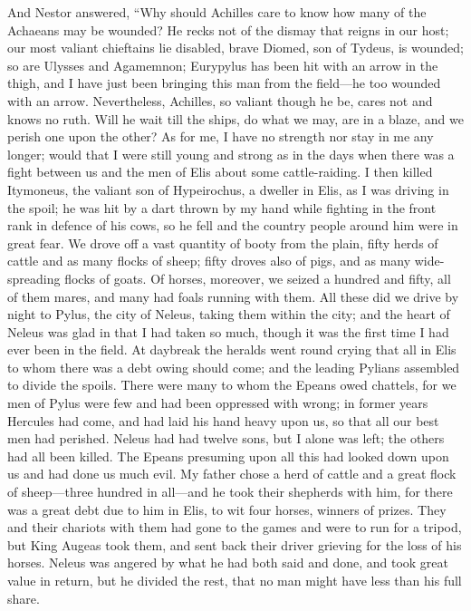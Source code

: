 And Nestor answered, “Why should Achilles care to know how many of the
Achaeans may be wounded? He recks not of the dismay that reigns in our
host; our most valiant chieftains lie disabled, brave Diomed, son of
Tydeus, is wounded; so are Ulysses and Agamemnon; Eurypylus has been hit
with an arrow in the thigh, and I have just been bringing this man from
the field—he too wounded with an arrow. Nevertheless, Achilles, so
valiant though he be, cares not and knows no ruth. Will he wait till the
ships, do what we may, are in a blaze, and we perish one upon the other?
As for me, I have no strength nor stay in me any longer; would that I were
still young and strong as in the days when there was a fight between us
and the men of Elis about some cattle-raiding. I then killed Itymoneus,
the valiant son of Hypeirochus, a dweller in Elis, as I was driving in the
spoil; he was hit by a dart thrown by my hand while fighting in the front
rank in defence of his cows, so he fell and the country people around him
were in great fear. We drove off a vast quantity of booty from the plain,
fifty herds of cattle and as many flocks of sheep; fifty droves also of
pigs, and as many wide-spreading flocks of goats. Of horses, moreover, we
seized a hundred and fifty, all of them mares, and many had foals running
with them. All these did we drive by night to Pylus, the city of Neleus,
taking them within the city; and the heart of Neleus was glad in that I
had taken so much, though it was the first time I had ever been in the
field. At daybreak the heralds went round crying that all in Elis to whom
there was a debt owing should come; and the leading Pylians assembled to
divide the spoils. There were many to whom the Epeans owed chattels, for
we men of Pylus were few and had been oppressed with wrong; in former
years Hercules had come, and had laid his hand heavy upon us, so that all
our best men had perished. Neleus had had twelve sons, but I alone was
left; the others had all been killed. The Epeans presuming upon all this
had looked down upon us and had done us much evil. My father chose a herd
of cattle and a great flock of sheep—three hundred in all—and
he took their shepherds with him, for there was a great debt due to him in
Elis, to wit four horses, winners of prizes. They and their chariots with
them had gone to the games and were to run for a tripod, but King Augeas
took them, and sent back their driver grieving for the loss of his horses.
Neleus was angered by what he had both said and done, and took great value
in return, but he divided the rest, that no man might have less than his
full share.

